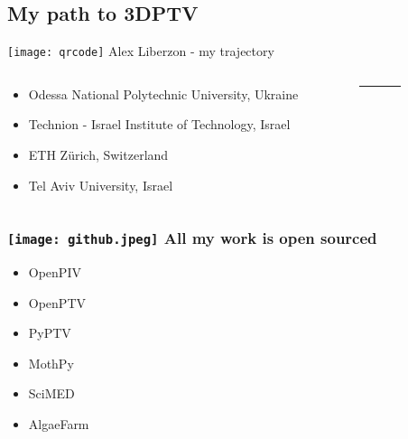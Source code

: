 

% 

\subsection{My path to 3DPTV}
%

\begin{frame}[label=intro-1]{\texttt{[image: qrcode]} Alex Liberzon - my trajectory }

\begin{columns}
\begin{column}{.78\textwidth}
\begin{card}
\begin{itemize}
\item Odessa National Polytechnic University, Ukraine
\item Technion - Israel Institute of Technology, Israel
\item ETH Z\"{u}rich, Switzerland
\item Tel Aviv University, Israel
\end{itemize}
\end{card}
\end{column}

    \begin{column}{.02\textwidth}
        \rule{.1mm}{0.7\textheight}
    \end{column}
    
\begin{column}{.2\textwidth}
\end{column}
\end{columns}
\end{frame}
%
\begin{frame}[label=intro-2]
\frametitle{\texttt{[image: github.jpeg]} All my work is open sourced  }
\begin{multicols}{2}
\begin{card}
\begin{itemize}
\item OpenPIV
\item OpenPTV
\item PyPTV
\item MothPy
\item SciMED
\item AlgaeFarm
\end{itemize}
\end{card}
\end{multicols}
\end{frame}

